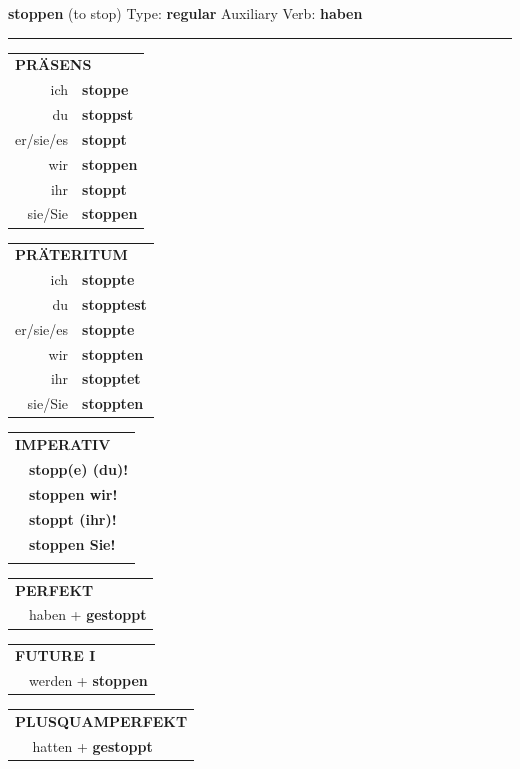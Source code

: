 \documentclass[10pt,a4paper]{revtex4-2}
\begin{document}
\begin{verbbox}
    {\Large \bf stoppen} (to stop) \hfill Type: \textbf{regular} \hfill Auxiliary Verb: \textbf{haben} 
    
     \vspace{5pt}

    \hrule
    
    \vspace{5pt}

  \begin{tabular}{rl}
     \multicolumn{2}{l}{\textbf{PRÄSENS} }\\
    ich & \textbf{stoppe}\\
    du & \textbf{stoppst}\\
    er/sie/es & \textbf{stoppt}\\
    wir & \textbf{stoppen}\\
    ihr & \textbf{stoppt}\\
    sie/Sie & \textbf{stoppen}\\
  \end{tabular}
  \hfill
     \begin{tabular}{rl}
    \multicolumn{2}{l}{\textbf{PRÄTERITUM} }\\
    ich & \textbf{stoppte}\\
    du & \textbf{stopptest}\\
    er/sie/es & \textbf{stoppte}\\
    wir & \textbf{stoppten}\\
    ihr & \textbf{stopptet}\\
    sie/Sie & \textbf{stoppten}\\
  \end{tabular}
  \hfill
  \begin{tabular}{rl}
     \multicolumn{2}{l}{\textbf{IMPERATIV} }\\
   & \textbf{stopp(e) (du)!}\\
   & \textbf{stoppen wir!}\\
   & \textbf{stoppt (ihr)!}\\
   & \textbf{stoppen Sie!}\\
   & \vspace{10pt}
  \end{tabular}

    \vspace{10pt}

 \begin{tabular}{rl}
     \multicolumn{2}{l}{\textbf{PERFEKT}}\\
   & haben + \textbf{gestoppt}\\
  \end{tabular}
\hfill
   \begin{tabular}{rl}
    \multicolumn{2}{l}{\textbf{FUTURE I} }\\
   & werden + \textbf{stoppen}\\
  \end{tabular}
\hfill
   \begin{tabular}{rl}
      \multicolumn{2}{l}{\textbf{PLUSQUAMPERFEKT}}\\
   & hatten + \textbf{gestoppt}\\
  \end{tabular}


\end{verbbox}
\end{document}

